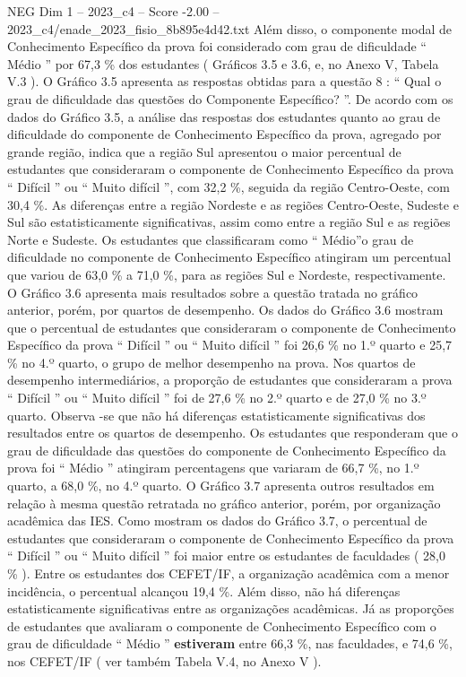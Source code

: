 \begin{textsample}{NEG Dim 1 – 2023\_c4 – Score -2.00 – 2023\_c4/enade\_2023\_fisio\_8b895e4d42.txt}
Além disso, o componente modal de Conhecimento Específico da prova foi considerado com grau de dificuldade “ Médio ” por 67,3 \% dos estudantes ( Gráficos 3.5 e 3.6, e, no Anexo V, Tabela V.3 ).
O Gráfico 3.5 apresenta as respostas obtidas para a questão 8 : “ Qual o grau de dificuldade das questões do Componente Específico? ”.
De acordo com os dados do Gráfico 3.5, a análise das respostas dos estudantes quanto ao grau de dificuldade do componente de Conhecimento Específico da prova, agregado por grande região, indica que a região Sul apresentou o maior percentual de estudantes que consideraram o componente de Conhecimento Específico da prova “ Difícil ” ou “ Muito difícil ”, com 32,2 \%, seguida da região Centro-Oeste, com 30,4 \%.
As diferenças entre a região Nordeste e as regiões Centro-Oeste, Sudeste e Sul são estatisticamente significativas, assim como entre a região Sul e as regiões Norte e Sudeste.
Os estudantes que classificaram como “ Médio”o grau de dificuldade no componente de Conhecimento Específico atingiram um percentual que variou de 63,0 \% a 71,0 \%, para as regiões Sul e Nordeste, respectivamente.
O Gráfico 3.6 apresenta mais resultados sobre a questão tratada no gráfico anterior, porém, por quartos de desempenho.
Os dados do Gráfico 3.6 mostram que o percentual de estudantes que consideraram o componente de Conhecimento Específico da prova “ Difícil ” ou “ Muito difícil ” foi 26,6 \% no 1.º quarto e 25,7 \% no 4.º quarto, o grupo de melhor desempenho na prova.
Nos quartos de desempenho intermediários, a proporção de estudantes que consideraram a prova “ Difícil ” ou “ Muito difícil ” foi de 27,6 \% no 2.º quarto e de 27,0 \% no 3.º quarto.
Observa -se que não há diferenças estatisticamente significativas dos resultados entre os quartos de desempenho.
Os estudantes que responderam que o grau de dificuldade das questões do componente de Conhecimento Específico da prova foi “ Médio ” atingiram percentagens que variaram de 66,7 \%, no 1.º quarto, a 68,0 \%, no 4.º quarto.
O Gráfico 3.7 apresenta outros resultados em relação à mesma questão retratada no gráfico anterior, porém, por organização acadêmica das IES.
Como mostram os dados do Gráfico 3.7, o percentual de estudantes que consideraram o componente de Conhecimento Específico da prova “ Difícil ” ou “ Muito difícil ” foi maior entre os estudantes de faculdades ( 28,0 \% ).
Entre os estudantes dos CEFET/IF, a organização acadêmica com a menor incidência, o percentual alcançou 19,4 \%.
Além disso, não há diferenças estatisticamente significativas entre as organizações acadêmicas.
Já as proporções de estudantes que avaliaram o componente de Conhecimento Específico com o grau de dificuldade “ Médio ” \textbf{estiveram} entre 66,3 \%, nas faculdades, e 74,6 \%, nos CEFET/IF ( ver também Tabela V.4, no Anexo V ).

\end{textsample}
